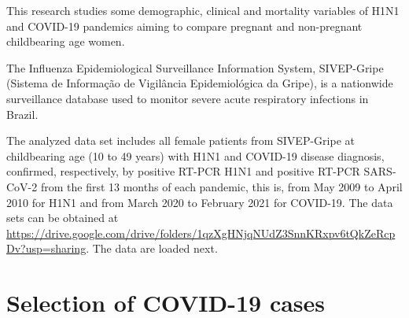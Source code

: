 \documentclass[
]{article}
\newenvironment{Shaded}{\begin{snugshade}}{\end{snugshade}}
\newcommand{\ControlFlowTok}[1]{\textcolor[rgb]{0.13,0.29,0.53}{\textbf{#1}}}
\newcommand{\DataTypeTok}[1]{\textcolor[rgb]{0.13,0.29,0.53}{#1}}
\newcommand{\DecValTok}[1]{\textcolor[rgb]{0.00,0.00,0.81}{#1}}
\newcommand{\KeywordTok}[1]{\textcolor[rgb]{0.13,0.29,0.53}{\textbf{#1}}}
\newcommand{\NormalTok}[1]{#1}
\newcommand{\OperatorTok}[1]{\textcolor[rgb]{0.81,0.36,0.00}{\textbf{#1}}}
\newcommand{\OtherTok}[1]{\textcolor[rgb]{0.56,0.35,0.01}{#1}}
\newcommand{\StringTok}[1]{\textcolor[rgb]{0.31,0.60,0.02}{#1}}
\begin{document}
\begin{Shaded}
\end{Shaded}

This research studies some demographic, clinical and mortality variables
of H1N1 and COVID-19 pandemics aiming to compare pregnant and
non-pregnant childbearing age women.

The Influenza Epidemiological Surveillance Information System,
SIVEP-Gripe (Sistema de Informação de Vigilância Epidemiológica da
Gripe), is a nationwide surveillance database used to monitor severe
acute respiratory infections in Brazil.

The analyzed data set includes all female patients from SIVEP-Gripe at
childbearing age (10 to 49 years) with H1N1 and COVID-19 disease
diagnosis, confirmed, respectively, by positive RT-PCR H1N1 and positive
RT-PCR SARS-CoV-2 from the first 13 months of each pandemic, this is,
from May 2009 to April 2010 for H1N1 and from March 2020 to February
2021 for COVID-19. The data sets can be obtained at
\url{https://drive.google.com/drive/folders/1qzXgHNjqNUdZ3SnnKRxpv6tQkZeRcpDv?usp=sharing}.
The data are loaded next.

\hypertarget{selection-of-covid-19-cases}{%
\section{Selection of COVID-19
cases}\label{selection-of-covid-19-cases}}
\end{document}
